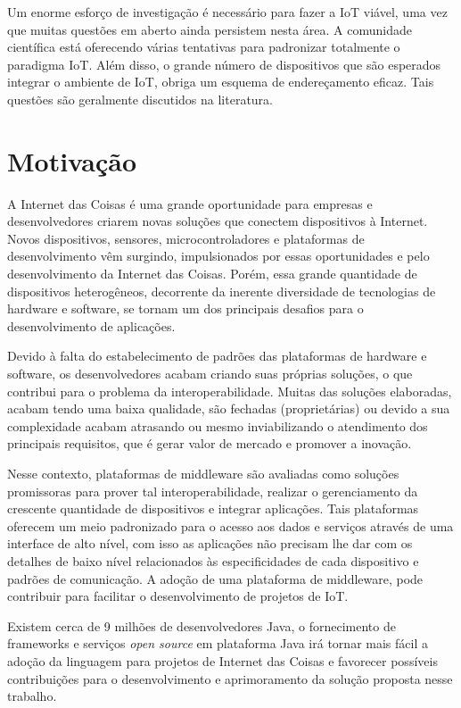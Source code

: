Um enorme esforço de investigação é necessário para fazer a IoT viável,
uma vez que muitas questões em aberto ainda persistem nesta área.
A comunidade científica está oferecendo várias tentativas para padronizar
totalmente o paradigma IoT. Além disso, o grande número de dispositivos
que são esperados integrar o ambiente de IoT, obriga um esquema de
endereçamento eficaz. Tais questões são geralmente discutidos na literatura\cite{yang2010,Katasonov2008}. 

\section{Motivação}

A Internet das Coisas é uma grande oportunidade para empresas e desenvolvedores
criarem novas soluções que conectem dispositivos à Internet. Novos
dispositivos, sensores, microcontroladores e plataformas de desenvolvimento
vêm surgindo, impulsionados por essas oportunidades e pelo desenvolvimento
da Internet das Coisas. Porém, essa grande quantidade de dispositivos
heterogêneos, decorrente da inerente diversidade de tecnologias de
hardware e software, se tornam um dos principais desafios para o desenvolvimento
de aplicações.

Devido à falta do estabelecimento de padrões das plataformas de hardware
e software, os desenvolvedores acabam criando suas próprias soluções,
o que contribui para o problema da interoperabilidade. Muitas das
soluções elaboradas, acabam tendo uma baixa qualidade, são fechadas
(proprietárias) ou devido a sua complexidade acabam atrasando ou mesmo
inviabilizando o atendimento dos principais requisitos, que é gerar
valor de mercado e promover a inovação.

Nesse contexto, plataformas de middleware são avaliadas como soluções
promissoras para prover tal interoperabilidade, realizar o gerenciamento
da crescente quantidade de dispositivos e integrar aplicações\cite{teixeira2011}.
Tais plataformas oferecem um meio padronizado para o acesso aos dados
e serviços através de uma interface de alto nível\cite{Bandyopadhyay2011},
com isso as aplicações não precisam lhe dar com os detalhes de baixo
nível relacionados às especificidades de cada dispositivo e padrões
de comunicação. A adoção de uma plataforma de middleware, pode contribuir
para facilitar o desenvolvimento de projetos de IoT.

Existem cerca de 9 milhões de desenvolvedores Java, o fornecimento
de frameworks e serviços \emph{open source} em plataforma Java irá
tornar mais fácil a adoção da linguagem para projetos de Internet
das Coisas e favorecer possíveis contribuições para o desenvolvimento
e aprimoramento da solução proposta nesse trabalho.

